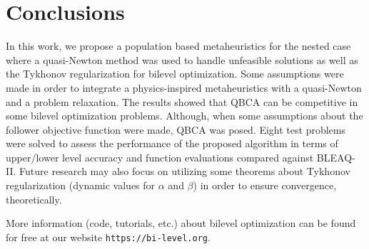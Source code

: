 \documentclass[conference]{IEEEtran}
\theoremstyle{definition}
\begin{document}
\section{Conclusions} %
\label{sec:conclusions}


In this work, we propose a population based metaheuristics for the nested case 
where a quasi-Newton method was used to handle unfeasible solutions as well as the 
Tykhonov regularization for bilevel optimization. Some assumptions were made in order
to integrate a physics-inspired metaheuristics with a quasi-Newton and a problem relaxation.
The results showed that QBCA can be competitive in some bilevel optimization problems.
Although, when some assumptions about the follower objective function were made,
QBCA was posed. Eight test problems were solved to assess the performance of the
proposed algorithm in terms of upper/lower level accuracy and function evaluations
compared against BLEAQ-II. Future research may also focus on utilizing some theorems
about Tykhonov regularization (dynamic values for $\alpha$ and $\beta$) in order
to ensure convergence, theoretically.


More information (code, tutorials, etc.) about bilevel optimization can be found
for free at our website \verb|https://bi-level.org|.





\end{document}
